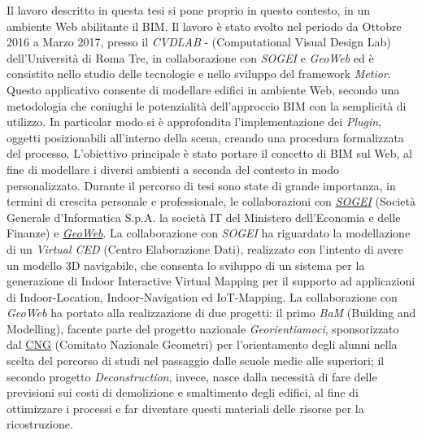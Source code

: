 Il lavoro descritto in questa tesi si pone proprio in questo contesto, in un ambiente Web abilitante il BIM.
Il lavoro è stato svolto nel periodo da Ottobre 2016 a Marzo 2017, presso il \emph{CVDLAB} - (Computational Visual Design Lab)
dell'Università di Roma Tre, in collaborazione con \emph{SOGEI} e \emph{GeoWeb}
ed è consistito nello studio delle tecnologie e nello sviluppo del framework \emph{Metior}.
Questo applicativo consente di modellare edifici in ambiente Web, secondo una metodologia che coniughi le potenzialità
dell’approccio BIM con la semplicità di utilizzo.
In particolar modo si è approfondita l'implementazione dei \emph{Plugin}, oggetti posizionabili all'interno della scena, creando
una procedura formalizzata del processo.
L'obiettivo principale è stato portare il concetto di BIM sul Web, al fine di modellare i diversi ambienti a seconda del
contesto in modo personalizzato.
Durante il percorso di tesi sono state di grande importanza, in termini di crescita personale e professionale,
le collaborazioni con \href{http://www.sogei.it/flex/cm/pages/ServeBLOB.php/L/IT/IDPagina/116}{\emph{SOGEI}}
(Società Generale d'Informatica S.p.A. la società IT del Ministero dell'Economia e delle Finanze)
e \href{http://www.geoweb.it/}{\emph{GeoWeb}}.
La collaborazione con \emph{SOGEI} ha riguardato la modellazione di un \emph{Virtual CED} (Centro Elaborazione Dati),
realizzato con l'intento di avere un modello 3D navigabile, che consenta lo sviluppo di un sistema per
la generazione di Indoor Interactive Virtual Mapping per il supporto ad applicazioni di Indoor-Location, Indoor-Navigation
ed IoT-Mapping.
La collaborazione con \emph{GeoWeb} ha portato alla realizzazione di due progetti: il primo \emph{BaM} (Building and Modelling),
facente parte del progetto nazionale \emph{Georientiamoci},
sponsorizzato dal \href{http://www.cng.it/it/consiglio-nazionale}{CNG} (Comitato Nazionale Geometri)
per l'orientamento degli alunni nella scelta del percorso di studi nel passaggio dalle scuole medie alle superiori;
il secondo progetto \emph{Deconstruction}, invece, nasce dalla necessità di fare delle previsioni
sui costi di demolizione e smaltimento degli edifici, al fine di ottimizzare i processi e far
diventare questi materiali delle risorse per la ricostruzione.
\newpage
